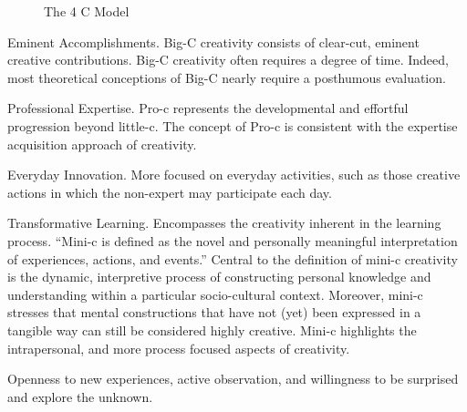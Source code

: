 \begin{figure}[!htbp]
  \centering
\caption[The 4 C Model]{The 4 C Model}
\label{fig:4C}
\end{figure}

\begin{description}[leftmargin=1.5cm]
  \item [Big-C] Eminent Accomplishments. Big-C creativity consists of clear-cut, eminent creative contributions. Big-C creativity often requires a degree of time. Indeed, most theoretical conceptions of Big-C nearly require a posthumous evaluation.
  \item [Pro-c] Professional Expertise. Pro-c represents the developmental and effortful progression beyond little-c. The concept of Pro-c is consistent with the expertise acquisition approach of creativity.
  \item [Little-c] Everyday Innovation. More focused on everyday activities, such as those creative actions in which the non-expert may participate each day.
  \item [Mini-c] Transformative Learning. Encompasses the creativity inherent in the learning process. ``Mini-c is defined as the novel and personally meaningful interpretation of experiences, actions, and events.'' \autocite{Beghetto2007} Central to the definition of mini-c creativity is the dynamic, interpretive process of constructing personal knowledge and understanding within a particular socio-cultural context. Moreover, mini-c stresses that mental constructions that have not (yet) been expressed in a tangible way can still be considered highly creative. Mini-c highlights the intrapersonal, and more process focused aspects of creativity.
  \item [All 4 C's] Openness to new experiences, active observation, and willingness to be surprised and explore the unknown.
\end{description}


